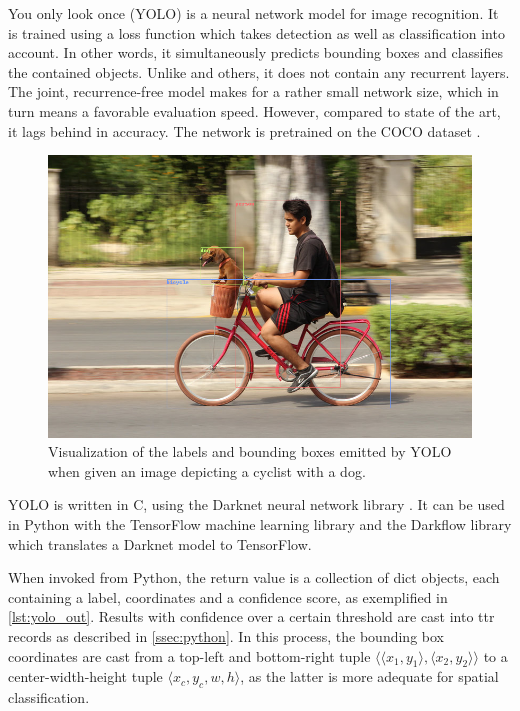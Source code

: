 You only look once (YOLO) \citep{RedmonYouOnlyLook2015} is a neural network model for image recognition.
It is trained using a loss function which takes detection as well as classification into account.
In other words, it simultaneously predicts bounding boxes and classifies the contained objects.
Unlike \cite{HeMaskRCNN2017} and others, it does not contain any recurrent layers.
The joint, recurrence-free model makes for a rather small network size, which in turn means a favorable evaluation speed.
However, compared to state of the art, it lags behind in accuracy.
The network is pretrained on the COCO dataset \cite{LinMicrosoftCOCOCommon2014}.

\begin{figure}[h]
\label{fig:dogbike_annotated}
\includegraphics[width=\textwidth]{dogbike_annotated}
\centering
\caption{Visualization of the labels and bounding boxes emitted by YOLO when given an image depicting a cyclist with a dog.}
\end{figure}

YOLO is written in C, using the Darknet neural network library \citep{darknet13}.
It can be used in Python with the TensorFlow machine learning library and the Darkflow library which translates a Darknet model to TensorFlow.

When invoked from Python, the return value is a collection of dict objects, each containing a label, coordinates and a confidence score, as exemplified in \autoref{lst:yolo_out}.
Results with confidence over a certain threshold are cast into \gls{ttr} records as described in \autoref{ssec:python}.
In this process, the bounding box coordinates are cast from a top-left and bottom-right tuple $\langle\langle x_1, y_1\rangle, \langle x_2, y_2\rangle\rangle$ to a center-width-height tuple $\langle x_c, y_c, w, h\rangle$, as the latter is more adequate for spatial classification.

